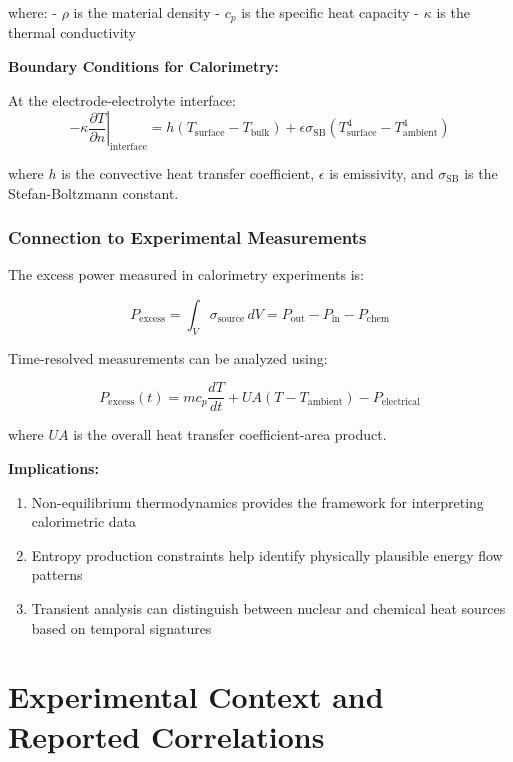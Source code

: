 \documentclass[11pt,a4paper]{article}
\begin{document}
where: - $\rho$ is the material density - $c_p$ is the specific heat capacity - $\kappa$ is the thermal conductivity

\textbf{Boundary Conditions for Calorimetry:}

At the electrode-electrolyte interface: \begin{equation}
-\kappa \left.\frac{\partial T}{\partial n}\right|_{\text{interface}} = h(T_{\text{surface}} - T_{\text{bulk}}) + \epsilon \sigma_{\text{SB}}(T_{\text{surface}}^4 - T_{\text{ambient}}^4)
\end{equation}

where $h$ is the convective heat transfer coefficient, $\epsilon$ is emissivity, and $\sigma_{\text{SB}}$ is the Stefan-Boltzmann constant.

\subsubsection{Connection to Experimental Measurements}

The excess power measured in calorimetry experiments is:

\begin{equation}
P_{\text{excess}} = \int_V \sigma_{\text{source}} \, dV = P_{\text{out}} - P_{\text{in}} - P_{\text{chem}}
\end{equation}

Time-resolved measurements can be analyzed using:

\begin{equation}
P_{\text{excess}}(t) = m c_p \frac{dT}{dt} + UA(T - T_{\text{ambient}}) - P_{\text{electrical}}
\end{equation}

where $UA$ is the overall heat transfer coefficient-area product.

\textbf{Implications:}

\begin{enumerate}
\def\labelenumi{\arabic{enumi}.}
\item
  Non-equilibrium thermodynamics provides the framework for interpreting calorimetric data
\item
  Entropy production constraints help identify physically plausible energy flow patterns
\item
  Transient analysis can distinguish between nuclear and chemical heat sources based on temporal signatures
\end{enumerate}

\section{Experimental Context and Reported Correlations}
\end{document}
